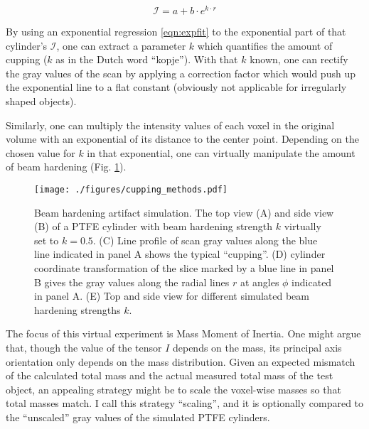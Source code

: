 \begin{equation}\label{eqn:expfit}
 \mathcal{I} = a+b\cdot e^{k\cdot r}
\end{equation}

By using an exponential regression \eqref{eqn:expfit} to the exponential part of that cylinder's  \(\mathcal{I}\), one can extract a parameter \(k\) which quantifies the amount of cupping (\(k\) as in the Dutch word ``kopje'').
With that \(k\) known, one can rectify the gray values of the scan by applying a correction factor which would push up the exponential line to a flat constant (obviously not applicable for irregularly shaped objects).

Similarly, one can multiply the intensity values of each voxel in the original volume with an exponential of its distance to the center point.
Depending on the chosen value for \(k\) in that exponential, one can virtually manipulate the amount of beam hardening (Fig. \ref{fig:cupping_methods}).


\begin{figure}[p]
\centering
\texttt{[image: ./figures/cupping\_methods.pdf]}
\caption{\label{fig:cupping_methods}Beam hardening artifact simulation. The top view (A) and side view (B) of a PTFE cylinder with beam hardening strength \(k\) virtually set to \(k=0.5\). (C) Line profile of scan gray values along the blue line indicated in panel A shows the typical ``cupping''. (D) cylinder coordinate transformation of the slice marked by a blue line in panel B gives the gray values along the radial lines \(r\) at angles \(\phi\) indicated in panel A. (E) Top and side view for different simulated beam hardening strengths \(k\).}
\end{figure}


The focus of this virtual experiment is Mass Moment of Inertia.
One might argue that, though the value of the tensor \(I\) depends on the mass, its principal axis orientation only depends on the mass distribution.
Given an expected mismatch of the calculated total mass and the actual measured total mass of the test object, an appealing strategy might be to scale the voxel-wise masses so that total masses match.
I call this strategy ``scaling'', and it is optionally compared to the ``unscaled'' gray values of the simulated PTFE cylinders.



